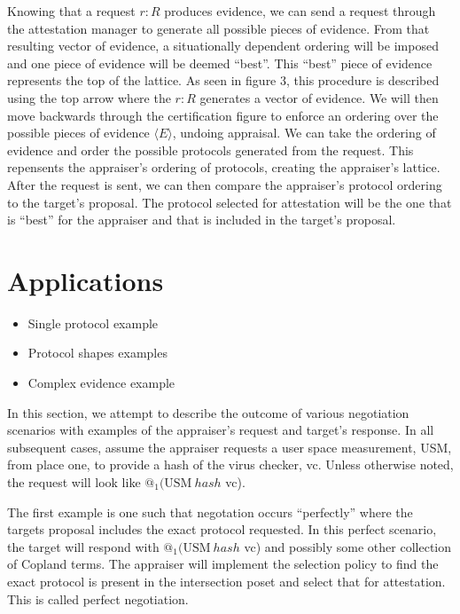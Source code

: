 \documentclass[sigconf,authordraft]{acmart}
\begin{document}
Knowing that a request $r:R$ produces evidence, we can send a request
through the attestation manager to generate all possible pieces of
evidence. From that resulting vector of evidence, a situationally
dependent ordering will be imposed and one piece of evidence will be
deemed ``best''. This ``best'' piece of evidence represents the top of
the lattice. As seen in figure 3, this procedure is described using
the top arrow where the $r:R$ generates a vector of evidence. We will
then move backwards through the certification figure to enforce an
ordering over the possible pieces of evidence $\langle E \rangle$,
undoing appraisal. We can take the ordering of evidence and order the
possible protocols generated from the request. This repensents the
appraiser's ordering of protocols, creating the appraiser's
lattice. After the request is sent, we can then compare the
appraiser's protocol ordering to the target's proposal. The protocol
selected for attestation will be the one that is ``best'' for the
appraiser and that is included in the target's proposal.

\section{Applications}

\begin{itemize}
\item Single protocol example
\item Protocol shapes examples
\item Complex evidence example

\end{itemize}

  
In this section, we attempt to describe the outcome of various
negotiation scenarios with examples of the appraiser's request and
target's response. In all subsequent cases, assume the appraiser
requests a user space measurement, USM, from place one, to provide a
hash of the virus checker, vc. Unless otherwise noted, the request
will look like $@_1 (\text{USM}\: hash$ vc).

The first example is one such that negotation occurs ``perfectly''
where the targets proposal includes the exact protocol requested. In
this \gls{perfect} scenario, the target will respond with
$@_1 (\text{USM}\: hash$ vc) and possibly some other collection of
Copland terms. The appraiser will implement the selection policy to
find the exact protocol is present in the intersection poset and
select that for attestation. This is called perfect negotiation.
\end{document}
